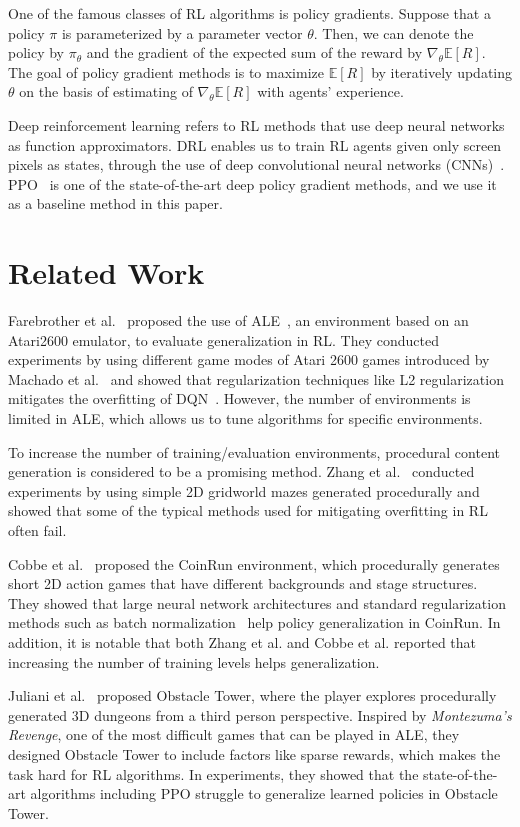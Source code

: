 \documentclass[conference]{IEEEtran}
\newcommand\zhang{Zhang et al.~\cite{Zhang1804}}
\newcommand\zhangns{Zhang et al.} %
\newcommand\cobbe{Cobbe et al.~\cite{Coinrun}}
\newcommand\cobbens{Cobbe et al.} %
\newcommand\juli{Juliani et al.~\cite{ObsTower}}
\newcommand\fare{Farebrother et al.~\cite{GeneralizeDQN}}
\newcommand\macha{Machado et al.~\cite{Machado18}}
\newcommand\pcg{procedural content generation} %
\begin{document}
One of the famous classes of RL algorithms is policy gradients. Suppose
that a policy $\pi$ is parameterized by a parameter vector $\theta$. 
Then, we can denote the policy by $\pi_\theta$ and the gradient of the
expected sum of the reward by $\nabla_\theta \mathbb{E}[R]$.
The goal of policy gradient methods is to maximize $\mathbb{E}[R]$ by
iteratively updating $\theta$ on the basis of estimating of
$\nabla_\theta \mathbb{E}[R]$ with agents' experience.

Deep reinforcement learning refers to RL methods that use deep
neural networks as function approximators.
DRL enables us to train RL agents given only screen pixels as states,
through the use of deep convolutional neural networks (CNNs)~\cite{DQN}.
PPO~\cite{PPO} is one of the state-of-the-art deep policy gradient
methods, and we use it as a baseline method in this paper.

\section{Related Work} \label{section:related-work}
\fare{} proposed the use of ALE~\cite{ALE}, an environment based on
an Atari2600 emulator, to evaluate generalization in RL.
They conducted experiments by using different game modes of Atari 2600
games introduced by \macha{} and showed that regularization
techniques like L2 regularization mitigates the overfitting of
DQN~\cite{DQN}.
However, the number of environments is limited in ALE, which allows us
to tune algorithms for specific environments.

To increase the number of training/evaluation environments, \pcg{} is
considered to be a promising method.
\zhang{} conducted experiments by using simple 2D gridworld mazes generated
procedurally and showed that some of the typical methods used for mitigating
overfitting in RL often fail.

\cobbe{} proposed the CoinRun environment, which procedurally generates
short 2D action games that have different backgrounds and stage
structures.
They showed that large neural network architectures and standard
regularization methods such as batch normalization~\cite{IoffeS15}
help policy generalization in CoinRun. 
In addition, it is notable that both \zhangns{} and \cobbens{} reported
that increasing the number of training levels helps generalization.

\juli{} proposed Obstacle Tower, where the player explores procedurally
generated 3D dungeons from a third person perspective.
Inspired by \textit{Montezuma's Revenge}, one of the most difficult
games that can be played in ALE, they designed Obstacle Tower to include
factors like sparse rewards, which makes the task hard for RL algorithms.
In experiments, they showed that the state-of-the-art algorithms
including PPO struggle to generalize learned policies in Obstacle Tower.
\end{document}
